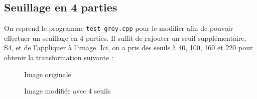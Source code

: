 \documentclass[french,a4paper,10pt]{article}
\begin{document}
	\subsection{Seuillage en 4 parties}\label{subsec:2.2}
	On reprend le programme \texttt{test\_grey.cpp} pour le modifier afin de pouvoir effectuer un seuillage en 4
	parties.
	Il suffit de rajouter un seuil supplémentaire, S4, et de l'appliquer à l'image.
	Ici, on a pris des seuils à 40, 100, 160 et 220 pour obtenir la transformation suivante :
	\begin{figure}[!htb]
		\begin{minipage}{0.48\textwidth}
			\centering
			\caption{Image originale}\label{Fig:orig-08-3}
		\end{minipage}\hfill
		\begin{minipage}{0.48\textwidth}
			\centering
			\caption{Image modifiée avec 4 seuils}\label{Fig:test-grey-08-4}
		\end{minipage}
	\end{figure}
\end{document}
